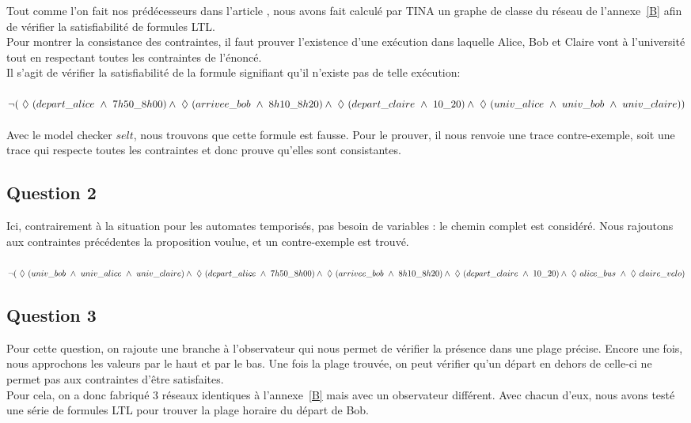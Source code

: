 \documentclass[11pt, a4paper]{article} %
\begin{document}
Tout comme l'on fait nos prédécesseurs dans l'article \cite{berthomieu2006reseaux}, nous avons fait calculé par TINA un graphe de classe du réseau de l'annexe~\ref{B} afin de vérifier la satisfiabilité de formules LTL.\\
Pour montrer la consistance des contraintes, il faut prouver l'existence d'une exécution dans laquelle Alice, Bob et Claire vont à l'université tout en respectant toutes les contraintes de l'énoncé.\\
Il s'agit de vérifier la satisfiabilité de la formule signifiant qu'il n'existe pas de telle exécution:\\
\\
$\lnot( \ \lozenge \ (depart\_alice \ \wedge \ 7h50\_8h00) \\
\wedge \ \lozenge \ (arrivee\_bob \ \wedge \  8h10\_8h20) \\
\wedge \  \lozenge \ (depart\_claire \ \wedge \ 10\_20) \\
\wedge \ \lozenge \ (univ\_alice \ \wedge \ univ\_bob \ \wedge \ univ\_claire))$
\\
\\
Avec le model checker $selt$, nous trouvons que cette formule est fausse. Pour le prouver, il nous renvoie une trace contre-exemple, soit une trace qui respecte toutes les contraintes et donc prouve qu'elles sont consistantes.

\subsection{Question 2}
\label{sub:TINAQ2}
Ici, contrairement à la situation pour les automates temporisés, pas besoin de variables : le chemin complet est considéré. Nous rajoutons aux contraintes précédentes la proposition voulue, et un contre-exemple est trouvé.\\
\\
$\lnot( \ \lozenge \ (univ\_bob \ \wedge \ univ\_alice \ \wedge \ univ\_claire) \\
\wedge \ \lozenge \ (depart\_alice \ \wedge \ 7h50\_8h00) \\
\wedge \ \lozenge \ (arrivee\_bob \ \wedge \ 8h10\_8h20) \\
\wedge \ \lozenge \ (depart\_claire \ \wedge \ 10\_20) \\
\wedge \ \lozenge \ alice\_bus \ \wedge \ \lozenge \ claire\_velo)$

\subsection{Question 3}
\label{sub:TINAQ3}
Pour cette question, on rajoute une branche à l'observateur qui nous permet de vérifier la présence dans une plage précise. Encore une fois, nous approchons les valeurs par le haut et par le bas. Une fois la plage trouvée, on peut vérifier qu'un départ en dehors de celle-ci ne permet pas aux contraintes d'être satisfaites.\\
Pour cela, on a donc fabriqué 3 réseaux identiques à l'annexe~\ref{B} mais avec un observateur différent. Avec chacun d'eux, nous avons testé une série de formules LTL pour trouver la plage horaire du départ de Bob.\\
\end{document}
